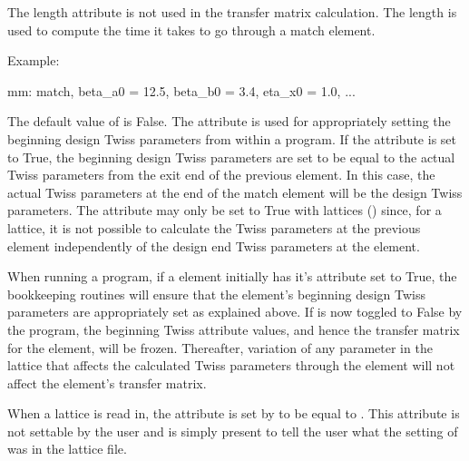 {
The length attribute  is not used in the transfer matrix
calculation. The length  is used to compute the time it takes to
go through a match element.

Example:
\begin{example}
  mm: match, beta_a0 = 12.5, beta_b0 = 3.4, eta_x0 = 1.0, ...
\end{example}

  \begin{description} 
  \item[match_end, match_end_input] \Newline
The default value of  is False. The 
attribute is used for appropriately setting the beginning design Twiss
parameters from within a program. If the  attribute is
set to True, the beginning design Twiss parameters are set to be equal
to the actual Twiss parameters from the exit end of the previous
element. In this case, the actual Twiss parameters at the end of the
match element will be the design Twiss parameters. The
 attribute may only be set to True with 
lattices () since, for a  lattice, it is not
possible to calculate the Twiss parameters at the previous element
independently of the design end Twiss parameters at the 
element.

When running a program, if a  element initially has it's
 attribute set to True, the \bmad bookkeeping
routines will ensure that the  element's beginning design
Twiss parameters are appropriately set as explained above. If
 is now toggled to False by the program, the beginning
Twiss attribute values, and hence the transfer matrix for the
 element, will be frozen. Thereafter, variation of any
parameter in the lattice that affects the calculated Twiss parameters
through the  element will not affect the 
element's transfer matrix.

When a lattice is read in, the  attribute is set by \bmad to be equal
to . This attribute is not settable by the user and is simply present to
tell the user what the setting of  was in the lattice file.


\end{description}}
